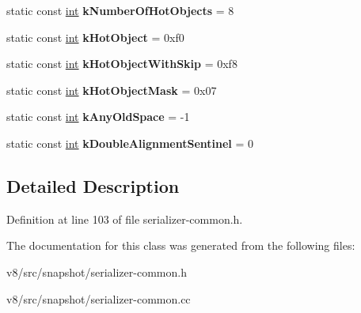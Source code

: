 \begin{DoxyCompactItemize}
static const \mbox{\hyperlink{classint}{int}} {\bfseries k\+Number\+Of\+Hot\+Objects} = 8
\item 
\mbox{\label{classv8_1_1internal_1_1SerializerDeserializer_ac39e2a4eb9319cdb5a9ceb8cc9eedbb4}} 
static const \mbox{\hyperlink{classint}{int}} {\bfseries k\+Hot\+Object} = 0xf0
\item 
\mbox{\label{classv8_1_1internal_1_1SerializerDeserializer_a028bc7093be724422c3a91f43129b53a}} 
static const \mbox{\hyperlink{classint}{int}} {\bfseries k\+Hot\+Object\+With\+Skip} = 0xf8
\item 
\mbox{\label{classv8_1_1internal_1_1SerializerDeserializer_aa7b54ddfe772ad4706022ec661f05096}} 
static const \mbox{\hyperlink{classint}{int}} {\bfseries k\+Hot\+Object\+Mask} = 0x07
\item 
\mbox{\label{classv8_1_1internal_1_1SerializerDeserializer_af329fb1f13991ff5d8f843cdd52b0736}} 
static const \mbox{\hyperlink{classint}{int}} {\bfseries k\+Any\+Old\+Space} = -\/1
\item 
\mbox{\label{classv8_1_1internal_1_1SerializerDeserializer_a71ed69f619892f6907c9367c41544300}} 
static const \mbox{\hyperlink{classint}{int}} {\bfseries k\+Double\+Alignment\+Sentinel} = 0
\end{DoxyCompactItemize}


\subsection{Detailed Description}


Definition at line 103 of file serializer-\/common.\+h.



The documentation for this class was generated from the following files\+:\begin{DoxyCompactItemize}
\item 
v8/src/snapshot/serializer-\/common.\+h\item 
v8/src/snapshot/serializer-\/common.\+cc\end{DoxyCompactItemize}
